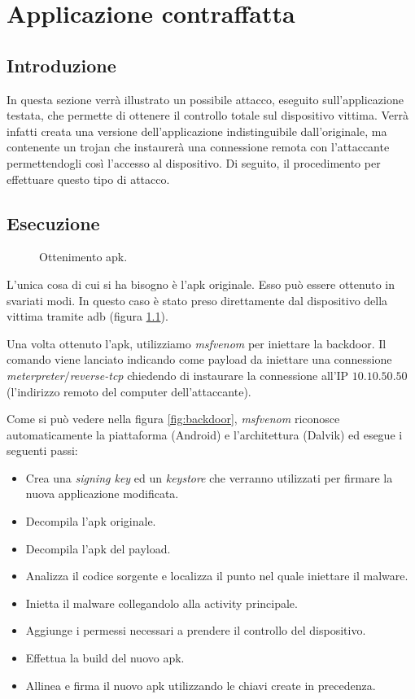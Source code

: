 \chapter{Applicazione contraffatta}

\section{Introduzione}

In questa sezione verrà illustrato un possibile attacco, eseguito sull'applicazione testata, che permette di ottenere il controllo totale sul dispositivo vittima. Verrà infatti creata una versione dell'applicazione indistinguibile dall'originale, ma contenente un trojan che instaurerà una connessione remota con l'attaccante permettendogli così l'accesso al dispositivo. Di seguito, il procedimento per effettuare questo tipo di attacco.

\section{Esecuzione}

\begin{figure}[h]
	\centering
	\caption{Ottenimento apk.}
	\label{fig:apk}
\end{figure}

L'unica cosa di cui si ha bisogno è l'apk originale. Esso può essere ottenuto in svariati modi. In questo caso è stato preso direttamente dal dispositivo della vittima tramite adb (figura \ref{fig:apk}).

Una volta ottenuto l'apk, utilizziamo \emph{msfvenom}\cite{MSFVenom} per iniettare la backdoor. Il comando viene lanciato indicando come payload da iniettare una connessione \emph{meterpreter}$/$\emph{reverse-tcp} chiedendo di instaurare la connessione all'IP $10.10.50.50$ (l'indirizzo remoto del computer dell'attaccante).

Come si può vedere nella figura \ref{fig:backdoor}, \emph{msfvenom} riconosce automaticamente la piattaforma (Android) e l'architettura (Dalvik) ed esegue i seguenti passi:

\begin{itemize}
	\item Crea una \emph{signing key} ed un \emph{keystore} che verranno utilizzati per firmare la nuova applicazione modificata.
	\item Decompila l'apk originale.
	\item Decompila l'apk del payload.
	\item Analizza il codice sorgente e localizza il punto nel quale iniettare il malware.
	\item Inietta il malware collegandolo alla activity principale.
	\item Aggiunge i permessi necessari a prendere il controllo del dispositivo.
	\item Effettua la build del nuovo apk.
	\item Allinea e firma il nuovo apk utilizzando le chiavi create in precedenza.
\end{itemize}

